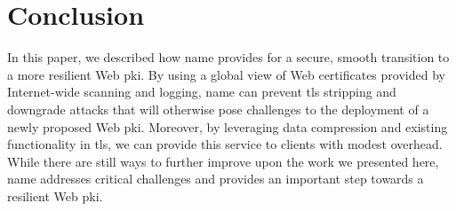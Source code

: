 \section{Conclusion}
\label{sec:conclusion}

In this paper, we described how \ac{name} provides for a secure, smooth
transition to a more resilient Web \ac{pki}. By using a global view of Web
certificates provided by Internet-wide scanning and logging, \ac{name} can
prevent \ac{tls} stripping and downgrade attacks that will otherwise pose
challenges to the deployment of a newly proposed Web \ac{pki}. Moreover, by leveraging
data compression and existing functionality in \ac{tls}, we can provide this
service to clients with modest overhead. While there are still ways to further
improve upon the work we presented here, \ac{name} addresses critical
challenges and provides an important step towards a resilient Web \ac{pki}. 

